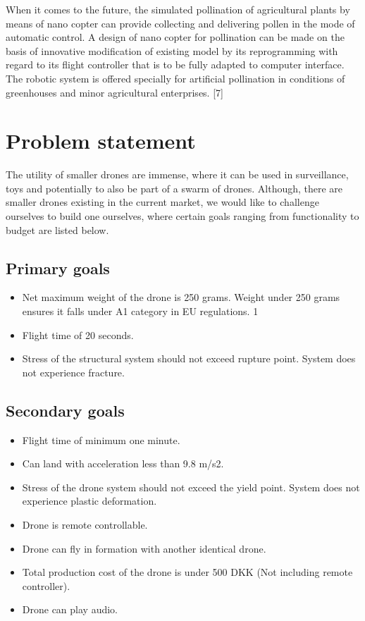 \documentclass{article}
\begin{document}
When it comes to the future, the simulated pollination of agricultural plants by means of nano copter can provide collecting and delivering pollen in the mode of automatic control. A design of nano copter for pollination can be made on the basis of innovative modification of existing model by its reprogramming with regard to its flight controller that is to be fully adapted to computer interface. The robotic system is offered specially for artificial pollination in conditions of greenhouses and minor agricultural enterprises. [7] 

 
\section{Problem statement}

The utility of smaller drones are immense, where it can be used in surveillance, toys and potentially to also be part of a swarm of drones. Although, there are smaller drones existing in the current market, we would like to challenge ourselves to build one ourselves, where certain goals ranging from functionality to budget are listed below. 


\subsection{Primary goals }
\begin{itemize}
    \item 
    Net maximum weight of the drone is 250 grams. Weight under 250 grams ensures it falls under A1 category in EU regulations. 1 
    \item
    Flight time of 20 seconds.
    \item
    Stress of the structural system should not exceed rupture point. System does not experience fracture. 
\end{itemize}


\subsection{Secondary goals}
\begin{itemize}
    \item 
    Flight time of minimum one minute. 
    \item
    Can land with acceleration less than 9.8 m/s2.
    \item
    Stress of the drone system should not exceed the yield point. System does not experience plastic deformation. 
    \item
    Drone is remote controllable. 
    \item
    Drone can fly in formation with another identical drone.
    \item
    Total production cost of the drone is under 500 DKK (Not including remote controller). 
    \item
    Drone can play audio.
\end{itemize}
\end{document}
